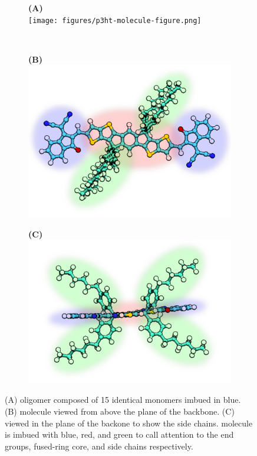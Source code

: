 \begin{figure}
\centering
\begin{subfigure}{.5\textwidth}
    \centering
    \textbf{(A)}  \\
    \texttt{[image: figures/p3ht-molecule-figure.png]}
\end{subfigure}%
\\
\begin{subfigure}{.3\textwidth}
    \textbf{(B)} 
    \centering
    \includegraphics[width=\textwidth]{figures/itic-backbone-figure.png}
\end{subfigure}%
\begin{subfigure}{.3\textwidth}
    \textbf{(C)} 
    \centering
    \includegraphics[width=\textwidth]{figures/itic-sidechain-figure.png}
\end{subfigure}
    \caption[]{(A)  oligomer composed of 15 identical monomers imbued in blue.
    (B)  molecule viewed from above the plane of the backbone. 
    (C)  viewed in the plane of the backone to show the side chains. 
    molecule is imbued with blue, red, and green to call attention to the end groups, fused-ring core, and
    side chains respectively.}
\label{molecules}
\end{figure}

